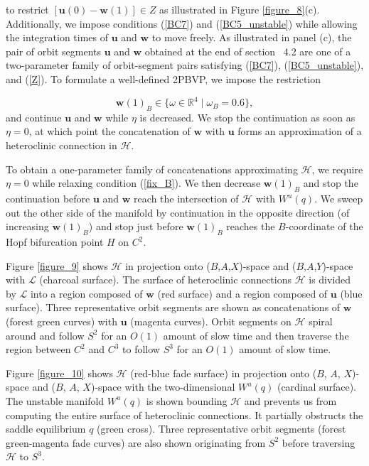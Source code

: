 \documentclass{ws-ijbc}
\begin{document}
\noindent
to restrict $[\mathbf{u}(0) -\mathbf{w}(1)] \in Z$ as illustrated in Figure \ref{figure_8}(c).  Additionally, we impose conditions (\ref{BC7}) and (\ref{BC5_unstable}) while allowing the integration times of $\mathbf{u}$ and $\mathbf{w}$ to move freely.  As illustrated in panel (c), the pair of orbit segments $\mathbf{u}$ and $\mathbf{w}$ obtained at the end of section ~4.2 are one of a two-parameter family of orbit-segment pairs satisfying (\ref{BC7}), (\ref{BC5_unstable}), and (\ref{Z}).  To formulate a well-defined 2PBVP, we impose the restriction

\begin{equation}
\mathbf{w}(1)_B \in \{ \omega \in \mathbb{R}^4 \; | \; \omega_B = 0.6 \},
\label{fix_B}
\end{equation}  
\noindent
and continue $\mathbf{u}$ and $\mathbf{w}$ while $\eta$ is decreased.  We stop the continuation as soon as $\eta = 0$, at which point the concatenation of $\mathbf{w}$ with $\mathbf{u}$ forms an approximation of a heteroclinic connection in $\mathscr{H}$.

To obtain a one-parameter family of concatenations approximating $\mathscr{H}$, we require $\eta = 0$ while relaxing condition (\ref{fix_B}).  We then decrease $\mathbf{w}(1)_B$ and stop the continuation before $\mathbf{u}$ and $\mathbf{w}$ reach the intersection of $\mathscr{H}$ with $W^u(q)$.  We sweep out the other side of the manifold by continuation in the opposite direction (of increasing $\mathbf{w}(1)_B$) and stop just before $\mathbf{w}(1)_B$ reaches the $B$-coordinate of the Hopf bifurcation point $H$ on $C^2$.

Figure \ref{figure_9} shows $\mathscr{H}$ in projection onto ($B$,$A$,$X$)-space and ($B$,$A$,$Y$)-space with $\mathscr{L}$ (charcoal surface).  The surface of heteroclinic connections $\mathscr{H}$ is divided by $\mathscr{L}$ into a region composed of $\mathbf{w}$ (red surface) and a region composed of $\mathbf{u}$ (blue surface).  Three representative orbit segments are shown as concatenations of $\mathbf{w}$ (forest green curves) with $\mathbf{u}$ (magenta curves).  Orbit segments on $\mathscr{H}$ spiral around and follow $S^2$ for an $O(1)$ amount of slow time and then traverse the region between $C^2$ and $C^3$ to follow $S^3$ for an $O(1)$ amount of slow time.

Figure \ref{figure_10} shows $\mathscr{H}$ (red-blue fade surface) in projection onto ($B$, $A$, $X$)-space and ($B$, $A$, $X$)-space with the two-dimensional $W^u(q)$ (cardinal surface).  The unstable manifold $W^u(q)$ is shown bounding $\mathscr{H}$ and prevents us from computing the entire surface of heteroclinic connections.  It partially obstructs the saddle equilibrium $q$ (green cross).  Three representative orbit segments (forest green-magenta fade curves) are also shown originating from $S^2$ before traversing $\mathscr{H}$ to $S^3$.
\end{document}
